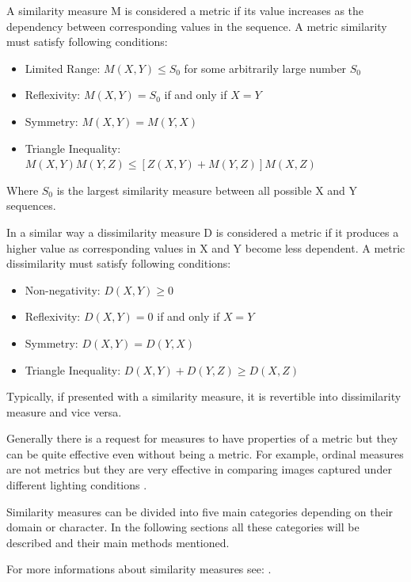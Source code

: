 A similarity measure M is considered a metric if its value increases as the dependency between corresponding values in the sequence. A metric similarity must satisfy following conditions:
\begin{itemize}
\item Limited Range: $M(X,Y) \leq S_0$ for some arbitrarily large number $S_0$
\item Reflexivity: $M(X,Y) = S_0$ if and only if $X=Y$
\item Symmetry: $M(X,Y)=M(Y,X)$
\item Triangle Inequality: $M(X,Y)M(Y,Z)\leq [Z(X,Y)+M(Y,Z)]M(X,Z)$
\end{itemize}
Where $S_0$ is the largest similarity measure between all possible X and Y sequences.

In a similar way a dissimilarity measure D is considered a metric if it produces a higher value as corresponding values in X and Y become less dependent. A metric dissimilarity must satisfy following conditions:
\begin{itemize}
\item Non-negativity: $D(X,Y) \geq 0$
\item Reflexivity: $D(X,Y) = 0$ if and only if $X = Y$
\item Symmetry: $D(X,Y) = D(Y,X)$
\item Triangle Inequality: $D(X,Y) + D(Y,Z) \geq D(X,Z)$
\end{itemize}

Typically, if presented with a similarity measure, it is revertible into dissimilarity measure and vice versa.

Generally there is a request for measures to have properties of a metric but they can be quite effective even without being a metric. For example, ordinal measures are not metrics but they are very effective in comparing images captured under different lighting conditions \cite{simMeasuresLecture}.

Similarity measures can be divided into five main categories depending on their domain or character. In the following sections all these categories will be described and their main methods mentioned.

For more informations about similarity measures see: \cite{clusteringSimMeasure} \cite{simDissim} \cite{simMeasuresLecture}.

